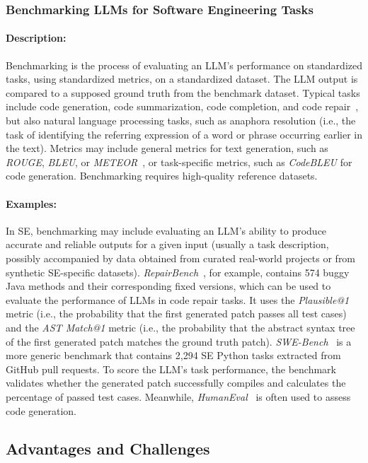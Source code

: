 \documentclass[smallextended]{svjour3}
\newcommand{\studytypesubsection}[1]{\subsubsection{#1}}
\newcommand{\studytypeparagraph}[1]{\paragraph{\bfseries #1:}}
\newcommand{\studytypesubsection}[1]{\subsection{#1}}
\newcommand{\studytypeparagraph}[1]{\subsubsection{#1}}
\begin{document}
\studytypesubsection{Benchmarking LLMs for Software Engineering Tasks}
\label{sec:benchmarking-llms-for-software-engineering-tasks}

\studytypeparagraph{Description}

Benchmarking is the process of evaluating an LLM's performance on standardized tasks, using standardized metrics, on a standardized dataset. The LLM output is compared to a supposed ground truth from the benchmark dataset. Typical tasks include code generation, code summarization, code completion, and code repair~\cite{yang2025code}, but also natural language processing tasks, such as anaphora resolution (i.e., the task of identifying the referring expression of a word or phrase occurring earlier in the text). %
Metrics may include general metrics for text generation, such as \emph{ROUGE}, \emph{BLEU}, or \emph{METEOR}~\cite{DBLP:journals/tosem/HouZLYWLLLGW24}, or task-specific metrics, such as \emph{CodeBLEU} for code generation.  Benchmarking requires high-quality reference datasets.

\studytypeparagraph{Examples}

In SE, benchmarking may include evaluating an LLM's ability to produce accurate and reliable outputs for a given input (usually a task description, possibly accompanied by data obtained from curated real-world projects or from synthetic SE-specific datasets). \emph{RepairBench}~\cite{DBLP:conf/llm4code/SilvaM25}, for example, contains 574 buggy Java methods and their corresponding fixed versions, which can be used to evaluate the performance of LLMs in code repair tasks. It uses the \emph{Plausible@1} metric (i.e., the probability that the first generated patch passes all test cases) and the \emph{AST Match@1} metric (i.e., the probability that the abstract syntax tree of the first generated patch matches the ground truth patch).
\emph{SWE-Bench}~\cite{DBLP:conf/iclr/JimenezYWYPPN24} is a more generic benchmark that contains 2,294 SE Python tasks extracted from GitHub pull requests.
To score the LLM's task performance, the benchmark validates whether the generated patch successfully compiles and calculates the percentage of passed test cases. Meanwhile, \emph{HumanEval}~\cite{DBLP:journals/corr/abs-2107-03374} is often used to assess code generation. 
 
\subsection{Advantages and Challenges}
\label{sec:advantages-challenges}
\end{document}

